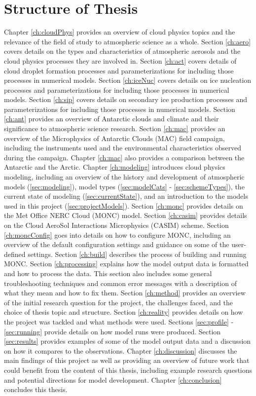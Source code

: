 \section{Structure of Thesis}
Chapter \ref{ch:cloudPhys} provides an overview of cloud physics topics and the relevance of the field of study to atmospheric science as a whole. Section \ref{ch:aero} covers details on the types and characteristics of atmospheric aerosols and the cloud physics processes they are involved in. Section \ref{ch:act} covers details of cloud droplet formation processes and parameterizations for including those processes in numerical models. Section \ref{ch:iceNuc} covers details on ice nucleation processes and parameterizations for including those processes in numerical models. Section \ref{ch:sip} covers details on secondary ice production processes and parameterizations for including those processes in numerical models. Section \ref{ch:ant} provides an overview of Antarctic clouds and climate and their significance to atmospheric science research. Section \ref{ch:mac} provides an overview of the Microphysics of Antarctic Clouds (MAC) field campaign, including the instruments used and the environmental characteristics observed during the campaign. Chapter \ref{ch:mac} also provides a comparison between the Antarctic and the Arctic. Chapter \ref{ch:modeling} introduces cloud physics modeling, including an overview of the history and development of atmospheric models (\ref{sec:modeling}), model types (\ref{sec:modelCats} - \ref{sec:schemeTypes}), the current state of modeling (\ref{sec:currentState}), and an introduction to the models used in this project (\ref{sec:projectModels}). Section \ref{ch:monc} provides details on the Met Office NERC Cloud (MONC) model. Section \ref{ch:casim} provides details on the Cloud AeroSol Interactions Microphysics (CASIM) scheme. Section \ref{ch:moncConfig} goes into details on how to configure MONC, including an overview of the default configuration settings and guidance on some of the user-defined settings. Section \ref{ch:build} describes the process of building and running MONC. Section \ref{ch:processing} explains how the model output data is formatted and how to process the data. This section also includes some general troubleshooting techniques and common error messages with a description of what they mean and how to fix them. Section \ref{ch:method} provides an overview of the initial research question for the project, the challenges faced, and the choice of thesis topic and structure. Section \ref{ch:reality} provides details on how the project was tackled and what methods were used. Sections \ref{sec:profile} - \ref{sec:running} provide details on how model runs were produced. Section \ref{sec:results} provides examples of some of the model output data and a discussion on how it compares to the observations. Chapter \ref{ch:discussion} discusses the main findings of this project as well as providing an overview of future work that could benefit from the content of this thesis, including example research questions and potential directions for model development. Chapter \ref{ch:conclusion} concludes this thesis.

